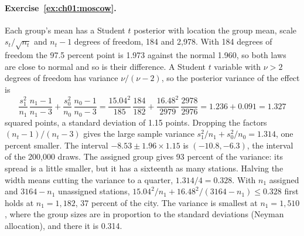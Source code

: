 \paragraph{Exercise~\ref{ex:ch01:moscow}.} Each group's mean has a Student $t$ posterior with location the group mean, scale $s_t/\sqrt{n_t}$ and $n_t - 1$ degrees of freedom, 184 and 2,978. With 184 degrees of freedom the 97.5 percent point is 1.973 against the normal 1.960, so both laws are close to normal and so is their difference. A Student $t$ variable with $\nu > 2$ degrees of freedom has variance $\nu/(\nu - 2)$, so the posterior variance of the effect is
\[
\frac{s_1^2}{n_1}\,\frac{n_1 - 1}{n_1 - 3} + \frac{s_0^2}{n_0}\,\frac{n_0 - 1}{n_0 - 3} = \frac{15.04^2}{185}\,\frac{184}{182} + \frac{16.48^2}{2979}\,\frac{2978}{2976} = 1.236 + 0.091 = 1.327
\]
squared points, a standard deviation of 1.15 points. Dropping the factors $(n_t - 1)/(n_t - 3)$ gives the large sample variance $s_1^2/n_1 + s_0^2/n_0 = 1.314$, one percent smaller. The interval $-8.53 \pm 1.96 \times 1.15$ is $(-10.8, -6.3)$, the interval of the 200,000 draws. The assigned group gives 93 percent of the variance: its spread is a little smaller, but it has a sixteenth as many stations. Halving the width means cutting the variance to a quarter, $1.314/4 = 0.328$. With $n_1$ assigned and $3164 - n_1$ unassigned stations, $15.04^2/n_1 + 16.48^2/(3164 - n_1) \le 0.328$ first holds at $n_1 = 1{,}182$, 37 percent of the city. The variance is smallest at $n_1 = 1{,}510$, where the group sizes are in proportion to the standard deviations (Neyman allocation), and there it is 0.314.

